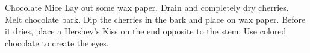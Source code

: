 \documentclass[../cookbook.tex]{subfiles}
\begin{document}
\begin{recipe}{Chocolate Mice}{}{}
    Lay out some wax paper.
    Drain and completely dry cherries.
    Melt chocolate bark. Dip the cherries in the bark and place on wax paper.
    Before it dries, place a Hershey's Kiss on the end opposite to the stem.
    Use colored chocolate to create the eyes.
\end{recipe}
\end{document}
